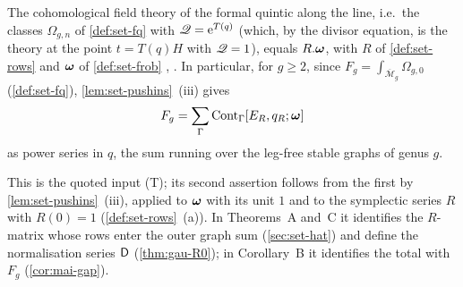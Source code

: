 \begin{thm}
\label{thm:set-GT}
The cohomological field theory of the formal quintic along the line, i.e.\ the classes $\Omega_{g,n}$ of \cref{def:set-fq} with $\mathscr{Q}=\mathrm{e}^{T(q)}$ (which, by the divisor equation, is the theory at the point $t=T(q)H$ with $\mathscr{Q}=1$), equals $R.\boldsymbol{\omega}$, with $R$ of \cref{def:set-rows} and $\boldsymbol{\omega}$ of \cref{def:set-frob} \cite[Theorem~(2) in (1.15)]{MR2917177}, \cite[Section~4.1, Theorem~4.1]{GJR18}. In particular, for $g\geq2$, since $F_g=\int_{\overline{\mathcal M}_g}\Omega_{g,0}$ (\cref{def:set-fq}), \cref{lem:set-pushins}~(iii) gives
\[
F_g=\sum_\Gamma\mathrm{Cont}_\Gamma[E_R,q_R;\boldsymbol{\omega}]
\]
as power series in $q$, the sum running over the leg-free stable graphs of genus $g$.
\end{thm}

This is the quoted input (T); its second assertion follows from the first by \cref{lem:set-pushins}~(iii), applied to $\boldsymbol{\omega}$ with its unit $1$ and to the symplectic series $R$ with $R(0)=1$ (\cref{def:set-rows}~(a)). In Theorems~A and~C it identifies the $R$-matrix whose rows enter the outer graph sum (\cref{sec:set-hat}) and define the normalisation series $\mathsf{D}$ (\cref{thm:gau-R0}); in Corollary~B it identifies the total with $F_g$ (\cref{cor:mai-gap}).


